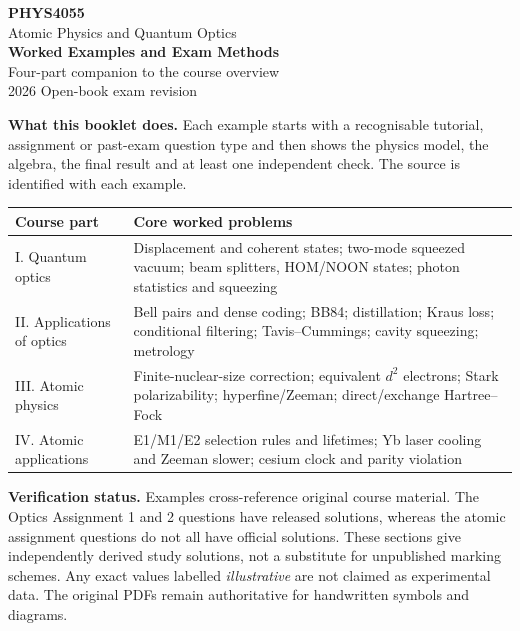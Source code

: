 \documentclass[10pt,a4paper]{article}
\begin{document}
\begin{center}
\vspace*{12mm}
{\Huge\bfseries\color{accent}PHYS4055}\\[4mm]
{\LARGE Atomic Physics and Quantum Optics}\\[7mm]
{\Large\bfseries Worked Examples and Exam Methods}\\[2mm]
{\large Four-part companion to the course overview}\\[8mm]
{\normalsize 2026 Open-book exam revision}
\end{center}
\vspace{6mm}
\begin{methodbox}
\textbf{What this booklet does.} Each example starts with a recognisable
tutorial, assignment or past-exam question type and then shows the
physics model, the algebra, the final result and at least one
independent check. The source is identified with each example.
\end{methodbox}
\begin{center}
\begin{tabular}{@{}p{4.0cm}p{9.7cm}@{}}
\toprule
\textbf{Course part}&\textbf{Core worked problems}\\\midrule
I. Quantum optics&
Displacement and coherent states; two-mode squeezed vacuum;
beam splitters, HOM/NOON states; photon statistics and squeezing\\
II. Applications of optics&
Bell pairs and dense coding; BB84; distillation; Kraus loss;
conditional filtering; Tavis--Cummings; cavity squeezing; metrology\\
III. Atomic physics&
Finite-nuclear-size correction; equivalent \(d^2\) electrons;
Stark polarizability; hyperfine/Zeeman; direct/exchange Hartree--Fock\\
IV. Atomic applications&
E1/M1/E2 selection rules and lifetimes;
Yb laser cooling and Zeeman slower; cesium clock and parity violation\\
\bottomrule
\end{tabular}
\end{center}
\bigskip
\textbf{Verification status.}
Examples cross-reference original course material. The Optics
Assignment 1 and 2 questions have released solutions, whereas the
atomic assignment questions do not all have official solutions.
These sections give independently derived study solutions, not
a substitute for unpublished marking schemes. Any exact values
labelled \emph{illustrative} are not claimed as experimental data.
The original PDFs remain authoritative for handwritten symbols and diagrams.
\vfill
{}
\clearpage
\tableofcontents
\clearpage
\end{document}
